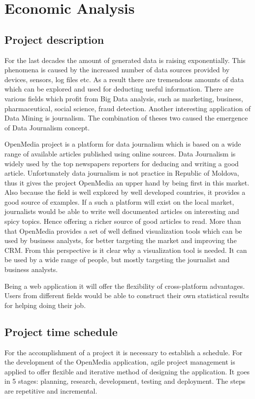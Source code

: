 \section{Economic Analysis}\label{sec:economy}

\subsection{Project description}
For the last decades the amount of generated data is raising exponentially. This phenomena is caused by the increased number of data sources provided by devices, sensors, log files etc. As a result there are tremendous amounts of data which can be explored and used for deducting useful information. There are various fields which profit from Big Data analysis, such as marketing, business, pharmaceutical, social science, fraud detection. Another interesting application of Data Mining is journalism. The combination of theses two caused the emergence of Data Journalism concept.

OpenMedia project is a platform for data journalism which is based on a wide range of available articles published using online sources. Data Journalism is widely used by the top newspapers reporters for deducing and writing a good article. Unfortunately data journalism is not practice in Republic of Moldova, thus it gives the project OpenMedia an upper hand by being first in this market. Also because the field is well explored by well developed countries, it provides a good source of examples. If a such a platform will exist on the local market, journalists would be able to write well documented articles on interesting and spicy topics. Hence offering a richer source of good articles to read. More than that OpenMedia provides a set of well defined visualization tools which can be used by business analysts, for better targeting the market and improving the CRM. From this perspective is it clear why a visualization tool is needed. It can be used by a wide range of people, but mostly targeting the journalist and business analysts.

Being a web application it will offer the flexibility of cross-platform advantages. Users from different fields would be able to construct their own statistical results for helping doing their job.

\subsection{Project time schedule}
For the accomplishment of a project it is necessary to establish a schedule. For the development of the OpenMedia application, agile project management is applied to offer flexible and iterative method of designing the application. It goes in 5 stages: planning, research, development, testing and deployment. The steps are repetitive and incremental.

